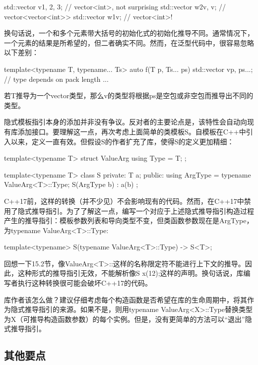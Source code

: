 \begin{cpp}
std::vector v{1, 2, 3}; // vector<int>, not surprising
std::vector w2{v, v}; // vector<vector<int>>
std::vector w1{v}; // vector<int>!
\end{cpp}

换句话说，一个和多个元素带大括号的初始化式的初始化推导不同。通常情况下，一个元素的结果是所希望的，但二者确实不同。然而，在泛型代码中，很容易忽略以下差别：

\begin{cpp}
template<typename T, typename... Ts>
auto f(T p, Ts... ps) {
	std::vector v{p, ps...}; // type depends on pack length
	...
}
\end{cpp}

若T推导为一个vector类型，那么v的类型将根据ps是空包或非空包而推导出不同的类型。

隐式模板指引本身的添加并非没有争议。反对者的主要论点是，该特性会自动向现有库添加接口。要理解这一点，再次考虑上面简单的类模板S。自模板在C++中引入以来，定义一直有效。但假设S的作者扩充了库，使得S的定义更加精细：

\begin{cpp}
template<typename T>
struct ValueArg {
	using Type = T;
};

template<typename T>
class S {
	private:
	T a;
	public:
	using ArgType = typename ValueArg<T>::Type;
	S(ArgType b) : a(b) {
	}
};
\end{cpp}

C++17前，这样的转换（并不少见）不会影响现有的代码。然而，在C++17中禁用了隐式推导指引。为了了解这一点，编写一个对应于上述隐式推导指引构造过程产生的推导指引：模板参数列表和导向类型不变，但类函数参数现在是ArgType，为typename ValueArg<T>::Type:

\begin{cpp}
template<typename> S(typename ValueArg<T>::Type) -> S<T>;
\end{cpp}

回想一下15.2节，像ValueArg<T>::这样的名称限定符不能进行上下文的推导。因此，这种形式的推导指引无效，不能解析像S x(12);这样的声明。换句话说，库编写者执行这种转换很可能会破坏C++17的代码。

库作者该怎么做？建议仔细考虑每个构造函数是否希望在库的生命周期中，将其作为隐式推导指引的来源。如果不是，则用typename ValueArg<X>::Type替换类型为X（可推导构造函数参数）的每个实例。但是，没有更简单的方法可以“退出”隐式推导指引。

\subsection{其他要点}

